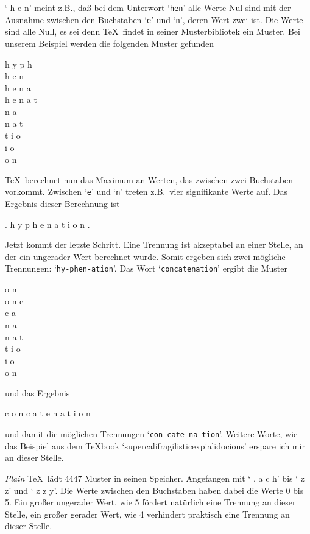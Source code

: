 \begin{appendix}
` h e n' meint z.B., da\ss{} bei dem Unterwort `\verb|hen|'
alle Werte Nul sind mit der Ausnahme zwischen den Buchstaben `\verb|e|'
und `\verb|n|', deren Wert zwei ist. Die Werte sind alle Null, es sei
denn \TeX\ findet in seiner 
Musterbibliotek ein Muster. Bei unserem
Beispiel werden die folgenden Muster gefunden

\noindent
{} h y p h\\
 h e n\\
 h e n a\\
 h e n a t\\
 n a\\
 n a t\\
 t i o\\
 i o\\
 o n

\TeX\ berechnet nun das Maximum an Werten, das zwischen zwei
Buchstaben vorkommt. Zwischen `\verb|e|' und `\verb|n|' treten z.B.\
vier signifikante Werte auf. Das Ergebnis dieser Berechnung ist

. h y p h e n a t i o n .

Jetzt kommt der letzte Schritt. Eine Trennung ist akzeptabel an einer
Stelle, an der ein ungerader Wert berechnet wurde. Somit ergeben sich
zwei m\"ogliche Trennungen: `\verb|hy-phen-ation|'. Das Wort
`\verb|concatenation|' ergibt die Muster

\noindent
{} o n\\
\ti0 o n c\\
 c a\\
 n a\\
 n a t\\
\ti1 t i o\ti0\\
 i o\\
\ti0 o\ti2 n\ti0

und das Ergebnis

 c o n c a t e n a t i
o\ti2 n\ti0

und damit die m\"oglichen Trennungen `\verb|con-cate-na-tion|'. Weitere
Worte, wie das Beispiel aus dem \TeX book
`supercalifragilisticexpialidocious' erspare ich mir an dieser Stelle.

{\em Plain} \TeX\ l\"adt 4447 
Muster in seinen Speicher. Angefangen mit
` .\ti0 a c h' bis `\ti4 z z' und
`\ti0 z\ti4 z\ti0 y\ti0'. Die Werte zwischen den Buchstaben haben
dabei die Werte 0 bis 5. Ein gro\ss{}er ungerader Wert, wie 5 f\"ordert
nat\"urlich eine Trennung an dieser Stelle, ein gro\ss{}er gerader Wert,
wie 4 verhindert praktisch eine Trennung an dieser Stelle.


\end{appendix}
